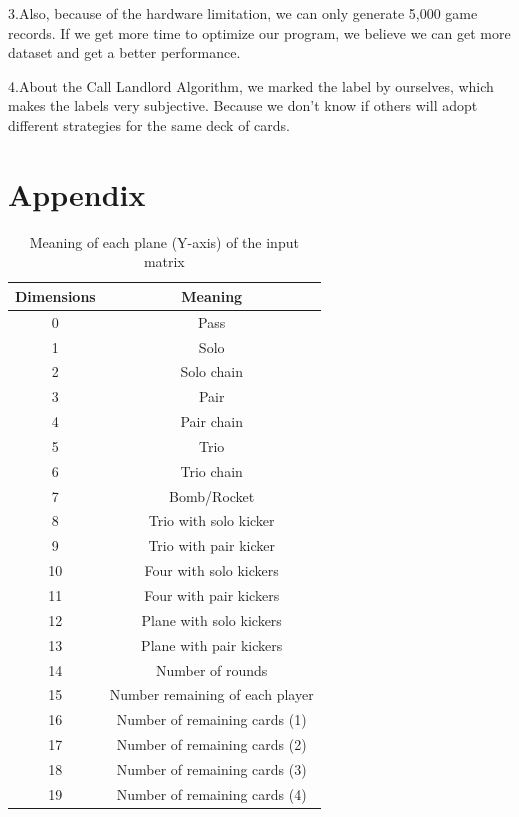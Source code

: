 \documentclass{article}
\begin{document}
3.Also, because of the hardware limitation, we can only generate 5,000 game records. If we get more time to optimize our program, we believe we can get more dataset and get a better performance.

4.About the Call Landlord Algorithm, we marked the label by ourselves, which makes the labels very subjective. Because we don’t know if others will adopt different strategies for the same deck of cards.







\clearpage
\section*{Appendix}

\begin{table}[!ht]
    \caption{Meaning of each plane (Y-axis) of the input matrix}\label{Yinput}
    \centering
    \begin{threeparttable}          
      \begin{tabular}{cc}\toprule
Dimensions & Meaning                         \\ \hline
0          & Pass                            \\
1          & Solo                            \\
2          & Solo chain                      \\
3          & Pair                            \\
4          & Pair chain                      \\
5          & Trio                            \\
6          & Trio chain                      \\
7          & Bomb/Rocket                     \\
8          & Trio with solo kicker           \\
9          & Trio with pair kicker           \\
10         & Four with solo kickers          \\
11         & Four with pair kickers          \\
12         & Plane with solo kickers         \\
13         & Plane with pair kickers         \\
14         & Number of rounds                \\
15         & Number remaining of each player \\
16         & Number of remaining cards (1)   \\
17         & Number of remaining cards (2)   \\
18         & Number of remaining cards (3)   \\
19         & Number of remaining cards (4)  \\ \hline
      \end{tabular}
    \end{threeparttable}  
  \end{table}
  
\end{document}
